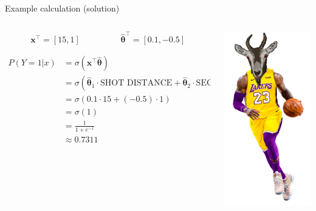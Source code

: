 \documentclass[aspectratio=169]{../latex_main/tntbeamer}  %
\begin{document}
	
	\begin{frame}{Example calculation (solution)}
	   
	   \begin{columns}
	    
	   \begin{column}{.6\textwidth}
	   \begin{equation*}
	       \bm{x}^\intercal = [15, 1]\hspace{2cm} \hat{\bm\theta}^\intercal = [0.1, -0.5]
	   \end{equation*}
	   
	   \begin{align*}
	       P(Y=1|x) &= \sigma (\bm{x}^\intercal\hat{\bm\theta})\\
	       &= \sigma (\hat{\bm\theta}_1 \cdot \text{SHOT DISTANCE} + \hat{\bm\theta}_2 \cdot \text{SECONDS LEFT} )\\
	       &=  \sigma (0.1 \cdot 15 + (-0.5) \cdot 1 )\\
	       &= \sigma (1)\\
	       &= \frac{1}{1 + e^{-1}}\\
	       &\approx 0.7311
	   \end{align*}
	    \end{column}
	    
	    \begin{column}{.4\textwidth}

	            \centering
	            \includegraphics[scale=.5]{Bild8}
	            
	    \end{column}
	    
	    \end{columns}
	\end{frame}
	
\end{document}

